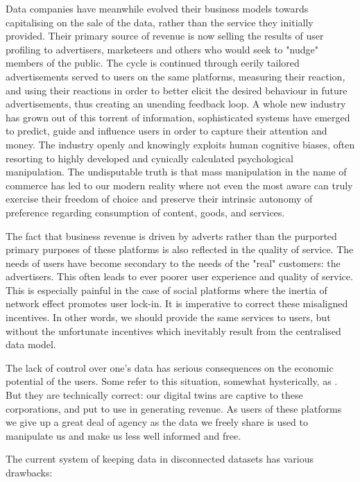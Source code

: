 Data companies have meanwhile evolved their business models towards capitalising on the sale of the data, rather than the service they initially provided. Their primary source of revenue is now selling the results of user profiling to advertisers, marketeers and others who would seek to "nudge" members of the public. The cycle is continued through eerily tailored advertisements served to users on the same platforms, measuring their reaction, and using their reactions in order to better elicit the desired behaviour in future advertisements, thus creating an unending feedback loop. A whole new industry has grown out of this torrent of information, sophisticated systems have emerged to predict, guide and influence users in order to capture their attention and money. The industry openly and knowingly exploits human cognitive biases, often resorting to highly developed and cynically calculated psychological manipulation. The undisputable truth is that mass manipulation in the name of commerce has led to our modern reality where not even the most aware can truly exercise their freedom of choice and preserve their intrinsic autonomy of preference regarding consumption of content, goods, and services.

The fact that business revenue is driven by adverts rather than the purported primary purposes of these platforms is also reflected in the quality of service. The needs of users have become secondary to the needs of the "real" customers: the advertisers. This often leads to ever poorer user experience and quality of service. This is especially painful in the case of social platforms where the inertia of network effect promotes user lock-in. It is imperative to correct these misaligned incentives. In other words, we should provide the same services to users, but without the unfortunate incentives which inevitably result from the centralised data model.

The lack of control over one's data has serious consequences on the economic potential of the users. Some refer to this situation, somewhat hysterically, as . But they are technically correct: our digital twins are captive to these corporations, and put to use in generating revenue. As users of these platforms we give up a great deal of agency as the data we freely share is used to manipulate us and make us less well informed and free. 

The current system of keeping data in disconnected datasets has various drawbacks: 

